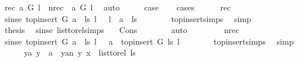 \begin{isabellebody}
\ {\isacharparenleft}{\kern0pt}rec{\isacharparenright}{\kern0pt}\ {\isachardoublequoteopen}a\ {\isasymrightarrow}\isactrlsup {\isacharplus}{\kern0pt}\isactrlbsub G\isactrlesub \ l{\isachardoublequoteclose}\ {\isacharbar}{\kern0pt}\ {\isacharparenleft}{\kern0pt}nrec{\isacharparenright}{\kern0pt}\ {\isachardoublequoteopen}{\isasymnot}\ a\ {\isasymrightarrow}\isactrlsup {\isacharplus}{\kern0pt}\isactrlbsub G\isactrlesub \ l{\isachardoublequoteclose}\ \isamarkupfalse%
\ auto\isanewline
\ \ \isamarkupfalse%
\ \isamarkupfalse%
\ {\isacharquery}{\kern0pt}case\ \isanewline
\ \ \isamarkupfalse%
{\isacharparenleft}{\kern0pt}cases{\isacharparenright}{\kern0pt}\isanewline
\ \ \ \ \isamarkupfalse%
\ rec\isanewline
\ \ \ \ \isamarkupfalse%
\ \isamarkupfalse%
\ sinse{\isacharcolon}{\kern0pt}\ {\isachardoublequoteopen}{\isacharparenleft}{\kern0pt}top{\isacharunderscore}{\kern0pt}insert\ G\ {\isacharparenleft}{\kern0pt}a\ {\isacharhash}{\kern0pt}\ ls{\isacharparenright}{\kern0pt}\ l{\isacharparenright}{\kern0pt}\ \ {\isacharequal}{\kern0pt}\ l\ {\isacharhash}{\kern0pt}\ a\ {\isacharhash}{\kern0pt}\ ls{\isachardoublequoteclose}\isanewline
\ \ \ \ \ \ \isamarkupfalse%
\ top{\isacharunderscore}{\kern0pt}insert{\isachardot}{\kern0pt}simps\ \isamarkupfalse%
\ simp\isanewline
\ \ \ \ \isamarkupfalse%
\ {\isacharquery}{\kern0pt}thesis\ \isamarkupfalse%
\ sinse\ list{\isacharunderscore}{\kern0pt}to{\isacharunderscore}{\kern0pt}rel{\isachardot}{\kern0pt}simps\ \ \isamarkupfalse%
\ Cons\isanewline
\ \ \ \ \ \ \isamarkupfalse%
\ auto\isanewline
\ \ \isamarkupfalse%
\isanewline
\ \ \ \ \isamarkupfalse%
\ nrec\isanewline
\ \ \ \ \isamarkupfalse%
\ \isamarkupfalse%
\ sinse{\isacharcolon}{\kern0pt}\ {\isachardoublequoteopen}{\isacharparenleft}{\kern0pt}top{\isacharunderscore}{\kern0pt}insert\ G\ {\isacharparenleft}{\kern0pt}a\ {\isacharhash}{\kern0pt}\ ls{\isacharparenright}{\kern0pt}\ l{\isacharparenright}{\kern0pt}\ \ {\isacharequal}{\kern0pt}\ a\ {\isacharhash}{\kern0pt}\ top{\isacharunderscore}{\kern0pt}insert\ G\ ls\ l{\isachardoublequoteclose}\isanewline
\ \ \ \ \ \ \isamarkupfalse%
\ top{\isacharunderscore}{\kern0pt}insert{\isachardot}{\kern0pt}simps\ \isamarkupfalse%
\ simp\isanewline
\ \ \ \ \isamarkupfalse%
\ {\isacharparenleft}{\kern0pt}ya{\isacharparenright}{\kern0pt}\ {\isachardoublequoteopen}y\ {\isacharequal}{\kern0pt}\ a{\isachardoublequoteclose}\ {\isacharbar}{\kern0pt}\ {\isacharparenleft}{\kern0pt}yan{\isacharparenright}{\kern0pt}\ {\isachardoublequoteopen}{\isacharparenleft}{\kern0pt}y{\isacharcomma}{\kern0pt}\ x{\isacharparenright}{\kern0pt}\ {\isasymin}\ list{\isacharunderscore}{\kern0pt}to{\isacharunderscore}{\kern0pt}rel\ ls{\isachardoublequoteclose}\ \isamarkupfalse%

\end{isabellebody}
